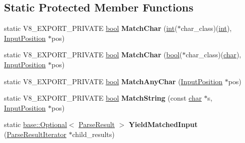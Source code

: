 \subsection*{Static Protected Member Functions}
\begin{DoxyCompactItemize}
\item 
\mbox{\label{classv8_1_1internal_1_1torque_1_1Grammar_a3dff1c4eb5d3abf399b36993fa4c7a6a}} 
static V8\+\_\+\+E\+X\+P\+O\+R\+T\+\_\+\+P\+R\+I\+V\+A\+TE \mbox{\hyperlink{classbool}{bool}} {\bfseries Match\+Char} (\mbox{\hyperlink{classint}{int}}($\ast$char\+\_\+class)(\mbox{\hyperlink{classint}{int}}), \mbox{\hyperlink{classchar}{Input\+Position}} $\ast$pos)
\item 
\mbox{\label{classv8_1_1internal_1_1torque_1_1Grammar_aad2a0e67ae8e035f5d78f1d71197c31d}} 
static V8\+\_\+\+E\+X\+P\+O\+R\+T\+\_\+\+P\+R\+I\+V\+A\+TE \mbox{\hyperlink{classbool}{bool}} {\bfseries Match\+Char} (\mbox{\hyperlink{classbool}{bool}}($\ast$char\+\_\+class)(\mbox{\hyperlink{classchar}{char}}), \mbox{\hyperlink{classchar}{Input\+Position}} $\ast$pos)
\item 
\mbox{\label{classv8_1_1internal_1_1torque_1_1Grammar_ab0b56837f0f197141b03c8b36c1db437}} 
static V8\+\_\+\+E\+X\+P\+O\+R\+T\+\_\+\+P\+R\+I\+V\+A\+TE \mbox{\hyperlink{classbool}{bool}} {\bfseries Match\+Any\+Char} (\mbox{\hyperlink{classchar}{Input\+Position}} $\ast$pos)
\item 
\mbox{\label{classv8_1_1internal_1_1torque_1_1Grammar_adc53679933c1efc1a394aed50c5cd4c0}} 
static V8\+\_\+\+E\+X\+P\+O\+R\+T\+\_\+\+P\+R\+I\+V\+A\+TE \mbox{\hyperlink{classbool}{bool}} {\bfseries Match\+String} (const \mbox{\hyperlink{classchar}{char}} $\ast$s, \mbox{\hyperlink{classchar}{Input\+Position}} $\ast$pos)
\item 
\mbox{\label{classv8_1_1internal_1_1torque_1_1Grammar_a5c84e2f52182fa46c44fe900c7e26f80}} 
static \mbox{\hyperlink{classv8_1_1base_1_1Optional}{base\+::\+Optional}}$<$ \mbox{\hyperlink{classv8_1_1internal_1_1torque_1_1ParseResult}{Parse\+Result}} $>$ {\bfseries Yield\+Matched\+Input} (\mbox{\hyperlink{classv8_1_1internal_1_1torque_1_1ParseResultIterator}{Parse\+Result\+Iterator}} $\ast$child\+\_\+results)

\end{DoxyCompactItemize}
